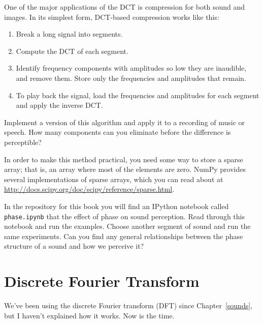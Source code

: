 \documentclass[12pt]{book}
\begin{document}
\begin{exercise}
One of the major applications of the DCT is compression for both
sound and images.  In its simplest form, DCT-based compression
works like this:

\begin{enumerate}

\item Break a long signal into segments.

\item Compute the DCT of each segment.

\item Identify frequency components with amplitudes so low they are
  inaudible, and remove them.  Store only the frequencies and
  amplitudes that remain.

\item To play back the signal, load the frequencies and amplitudes
  for each segment and apply the inverse DCT.

\end{enumerate}

Implement a version of this algorithm and apply it to a recording
of music or speech.  How many components can you eliminate before
the difference is perceptible?

In order to make this method practical, you need some way to store a
sparse array; that is, an array where most of the elements are zero.
NumPy provides several implementations of sparse arrays, which you can
read about at
\url{http://docs.scipy.org/doc/scipy/reference/sparse.html}.
\end{exercise}


\begin{exercise}
In the repository for this book you will find an IPython notebook
called \verb"phase.ipynb" that the effect of phase on sound
perception.
Read through this notebook and run the examples.  
Choose another segment of sound and run the same experiments.
Can you find any general relationships between the phase structure
of a sound and how we perceive it?
\end{exercise}




\chapter{Discrete Fourier Transform}
\label{dft}

We've been using the discrete Fourier transform (DFT) since
Chapter~\ref{sounds}, but I haven't explained how it works.  Now is
the time.
\end{document}
